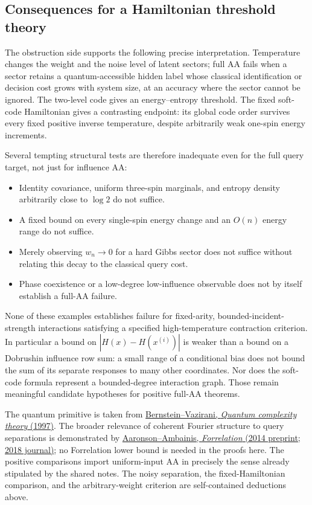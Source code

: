 \subsection{Consequences for a Hamiltonian threshold theory}
\label{threshold:negative-conclusions}

The obstruction side supports the following precise interpretation.
Temperature changes the weight and the noise level of latent sectors;
full AA fails when a sector retains a quantum-accessible hidden label
whose classical identification or decision cost grows with system
size, at an accuracy where the sector cannot be ignored.  The
two-level code gives an energy--entropy threshold.  The fixed soft-code
Hamiltonian gives a contrasting endpoint: its global code order
survives every fixed positive inverse temperature, despite arbitrarily
weak one-spin energy increments.

Several tempting structural tests are therefore inadequate even for
the full query target, not just for influence AA:
\begin{itemize}
\item Identity covariance, uniform three-spin marginals, and entropy
      density arbitrarily close to $\log2$ do not suffice.
\item A fixed bound on every single-spin energy change and an $O(n)$
      energy range do not suffice.
\item Merely observing $w_n\to0$ for a hard Gibbs sector does not
      suffice without relating this decay to the classical query cost.
\item Phase coexistence or a low-degree low-influence observable does
      not by itself establish a full-AA failure.
\end{itemize}

None of these examples establishes failure for fixed-arity,
bounded-incident-strength interactions satisfying a specified
high-temperature contraction criterion.  In particular a bound on
$|H(x)-H(x^{(i)})|$ is weaker than a bound on a Dobrushin influence
row sum: a small range of a conditional bias does not bound the sum
of its separate responses to many other coordinates.  Nor does the
soft-code formula represent a bounded-degree interaction graph.
Those remain meaningful candidate hypotheses for positive full-AA
theorems.

The quantum primitive is taken from
\href{https://people.eecs.berkeley.edu/~vazirani/pubs/bv.pdf}
{Bernstein--Vazirani, \emph{Quantum complexity theory} (1997)}.
The broader relevance of coherent Fourier structure to query
separations is demonstrated by
\href{https://arxiv.org/abs/1411.5729}
{Aaronson--Ambainis, \emph{Forrelation} (2014 preprint; 2018 journal)};
no Forrelation lower bound is needed in the proofs here.  The
positive comparisons import uniform-input AA in precisely the sense
already stipulated by the shared notes.  The noisy separation, the
fixed-Hamiltonian comparison, and the arbitrary-weight criterion are
self-contained deductions above.
